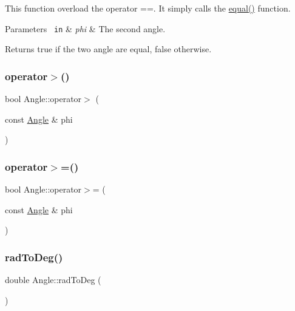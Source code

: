 This function overload the operator ==. It simply calls the {\ttfamily \mbox{\hyperlink{class_angle_a21d2e7c68957afdd5c7edf3efd3e0bdc}{equal()}}} function. 
\begin{DoxyParams}[1]{Parameters}
\mbox{\texttt{ in}}  & {\em phi} & The second angle. \\
\hline
\end{DoxyParams}
\begin{DoxyReturn}{Returns}
{\ttfamily true} if the two angle are equal, {\ttfamily false} otherwise. 
\end{DoxyReturn}
\mbox{\label{class_angle_a5c45045b213db3627055a4591b403224}} 
\subsubsection{\texorpdfstring{operator$>$()}{operator>()}}
{\footnotesize\ttfamily bool Angle\+::operator$>$ (\begin{DoxyParamCaption}\item[{const \mbox{\hyperlink{class_angle}{Angle}} \&}]{phi }\end{DoxyParamCaption})\hspace{0.3cm}{\ttfamily [inline]}}

\mbox{\label{class_angle_a2cedd44bb72da23b24d2fd57eacf3b79}} 
\subsubsection{\texorpdfstring{operator$>$=()}{operator>=()}}
{\footnotesize\ttfamily bool Angle\+::operator$>$= (\begin{DoxyParamCaption}\item[{const \mbox{\hyperlink{class_angle}{Angle}} \&}]{phi }\end{DoxyParamCaption})\hspace{0.3cm}{\ttfamily [inline]}}

\mbox{\label{class_angle_a8d7691e304041c8deafdec82497a781f}} 
\subsubsection{\texorpdfstring{radToDeg()}{radToDeg()}}
{\footnotesize\ttfamily double Angle\+::rad\+To\+Deg (\begin{DoxyParamCaption}{ }\end{DoxyParamCaption})\hspace{0.3cm}{\ttfamily [inline]}}



